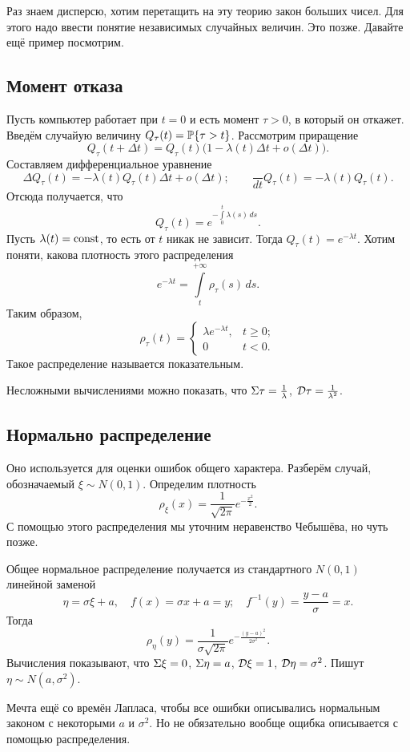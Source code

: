 Раз знаем дисперсю, хотим перетащить на эту теорию закон больших чисел. Для этого надо ввести понятие независимых случайных величин. Это позже. Давайте ещё пример посмотрим.
\subsection{Момент отказа}
Пусть компьютер работает при $t=0$ и есть момент $\tau>0$, в который он откажет. Введём случайую величину $Q_\tau(t) = \P\{\tau > t\}$. Рассмотрим приращение
\[
  Q_\tau(t + \Delta t) = Q_\tau (t) \big( 1 - \lambda(t)\Delta t + o(\Delta t)\big).
\]
Составляем дифференциальное уравнение
\[
  \Delta Q_\tau(t) = -\lambda(t)  Q_\tau(t) \Delta t + o(\Delta t);\qquad
  \frac{ }{dt}Q_\tau(t) = -\lambda(t) Q_\tau(t).
\]
Отсюда получается, что
\[
  Q_\tau(t) = e^{-\int\limits_0^t \lambda(s)\,ds}.
\]
Пусть $\lambda(t) = \const$, то есть от $t$ никак не зависит. Тогда $Q_\tau(t) = e^{-\lambda t}$. Хотим поняти, какова плотность этого распределения
\[
  e^{-\lambda t} = \int\limits_t^{+\infty} \rho_\tau (s)\,ds.
\]
Таким образом,
\[
  \rho_\tau(t) = \begin{cases}
  \lambda e^{-\lambda t},& t\ge 0;\\
   0 & t<0.
\end{cases}
\]
Такое распределение называется показательным.

Несложными вычислениями можно показать, что $\E\tau = \frac1\lambda$, $\D\tau = \frac1{\lambda^2}$.

\subsection{Нормально распределение}
Оно используется для оценки ошибок общего характера. Разберём случай, обозначаемый $\xi \sim N(0,1)$. Определим плотность
\[
  \rho_\xi(x) = \frac1{\sqrt{2\pi}} e^{-\frac{x^2}2}.
\]
С помощью этого распределения мы уточним неравенство Чебышёва, но чуть позже.

Общее нормальное распределение получается из стандартного $N(0,1)$ линейной заменой
\[
  \eta = \sigma \xi + a,\quad
  f(x) = \sigma x + a = y;\quad
  f^{-1}(y) = \frac{y - a}{\sigma} = x.
\]
Тогда
\[
  \rho_\eta(y) = \frac{1}{\sigma\sqrt{2\pi}} e^{-\frac{(y-a)^2}{2\sigma^2}}.
\]
Вычисления показывают, что $\E\xi = 0$, $\E\eta = a$, $\D\xi = 1$, $\D\eta = \sigma^2$. Пишут $\eta\sim N(a,\sigma^2)$.

Мечта ещё со времён Лапласа, чтобы все ошибки описывались нормальным законом с некоторыми $a$ и $\sigma^2$. Но не обязательно вообще ощибка описывается с помощью распределения.
